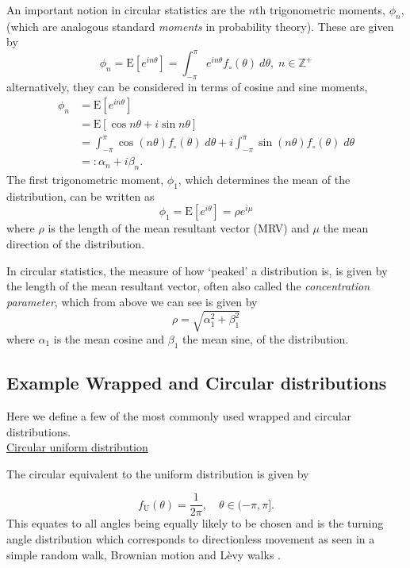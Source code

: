 \documentclass[english]{article}
\newcommand{\E}{\mathrm{E}}
\begin{document}
\begin{appendices}
An important notion in circular statistics are the $n$th trigonometric moments, $\phi_n$, (which are analogous  standard \textit{moments} in probability theory).  These are given by
\begin{equation}
    \phi_n=\E[e^{in\theta}]=\int_{-\pi}^{\pi}e^{in\theta}f_\circ(\theta)\:d\theta, \;n\in\mathbb{Z}^+
\end{equation}
alternatively, they can be considered in terms of cosine and sine moments,
\begin{align}\nonumber
    \phi_n&=\E[e^{in\theta}]\\\nonumber
    &=\E[\cos{n\theta}+i\sin{n\theta}]\\\nonumber
    &=\int_{-\pi}^{\pi}\cos{(n\theta)}f_\circ(\theta)\;d\theta+i\int_{-\pi}^{\pi}\sin{(n\theta)}f_\circ(\theta)\;d\theta\\\nonumber
    &=:\alpha_n+i\beta_n.
\end{align}
The first trigonometric moment, $\phi_1$, which determines the mean of the distribution, can be written as
\begin{equation}
    \phi_1=\E[e^{i\theta}]=\rho e^{i\mu}
\end{equation}
where $\rho$ is the length of the mean resultant vector (MRV) and $\mu$ the mean direction of the distribution.

In circular statistics, the measure of how `peaked' a distribution is, is given by the length of the mean resultant vector, often also called the \textit{concentration parameter}, which from above we can see is given by
\begin{equation}
    \rho=\sqrt{\alpha_1^2+\beta_1^2}
\end{equation}
where $\alpha_1$ is the mean cosine and $\beta_1$ the mean sine, of the distribution.

\subsection{Example Wrapped and Circular distributions}
Here we define a few of the most commonly used wrapped and circular distributions.\\

\noindent\underline{Circular uniform distribution}

\noindent The circular equivalent to the uniform distribution is given by

\begin{equation}
    f_{\text{U}}(\theta)=\frac{1}{2\pi},\quad \theta\in(-\pi,\pi].
\end{equation}
This equates to all angles being equally likely to be chosen and is the turning angle distribution which corresponds to directionless movement as seen in a simple random walk, Brownian motion and L\`{e}vy walks \citep{codling2008random,ahmed2023random}.\\



\end{appendices}
\end{document}
